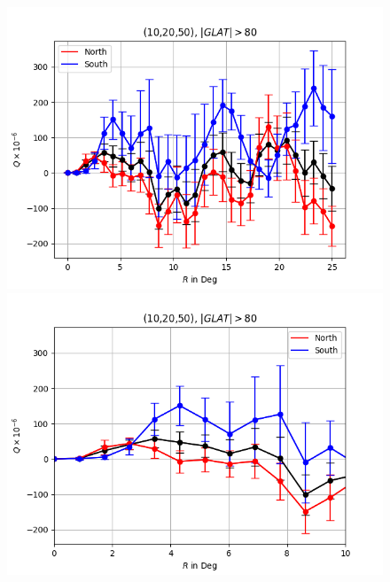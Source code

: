 \documentclass[english]{article}
\begin{document}
\begin{figure}
	\centering
	\includegraphics[scale=0.5]{10_20_50_full.png}\includegraphics[scale=0.5]{10_20_50_upto_10.png}

\end{figure}
\end{document}
